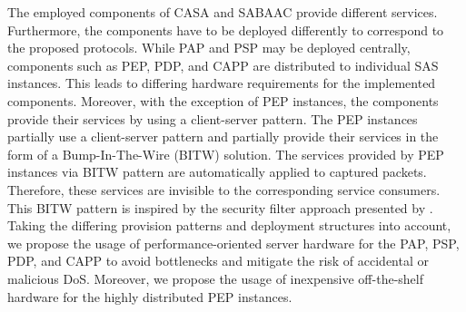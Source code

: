 The employed components of CASA and SABAAC provide different services.
Furthermore, the components have to be deployed differently to correspond to the proposed protocols.
While PAP and PSP may be deployed centrally, components such as PEP, PDP, and CAPP are distributed to individual SAS instances.
This leads to differing hardware requirements for the implemented components.
Moreover, with the exception of PEP instances, the components provide their services by using a client-server pattern.
The PEP instances partially use a client-server pattern and partially provide their services in the form of a Bump-In-The-Wire (BITW) solution.
The services provided by PEP instances via BITW pattern are automatically applied to captured packets.
Therefore, these services are invisible to the corresponding service consumers.
This BITW pattern is inspired by the security filter approach presented by \citeauthor{Ishchenko2018} \cite{Ishchenko2018}.
Taking the differing provision patterns and deployment structures into account, we propose the usage of performance-oriented server hardware for the PAP, PSP, PDP, and CAPP to avoid bottlenecks and mitigate the risk of accidental or malicious DoS.
Moreover, we propose the usage of inexpensive off-the-shelf hardware for the highly distributed PEP instances.
